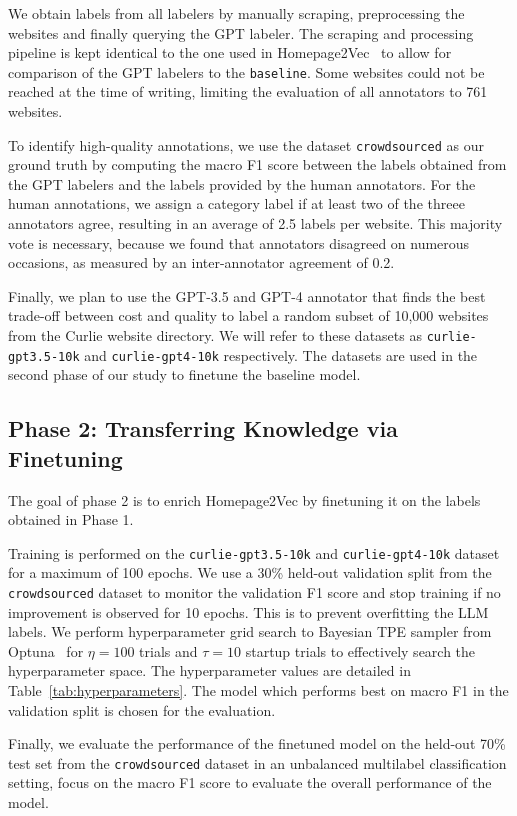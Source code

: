 We obtain labels from all labelers by manually scraping, preprocessing the websites and finally querying the GPT labeler. The scraping and processing pipeline is kept identical to the one used in Homepage2Vec~\cite{homepage2vec} to allow for comparison of the GPT labelers to the \texttt{baseline}. Some websites could not be reached at the time of writing, limiting the evaluation of all annotators to 761 websites.

To identify high-quality annotations, we use the dataset \texttt{crowdsourced} as our ground truth by computing the macro F1 score between the labels obtained from the GPT labelers and the labels provided by the human annotators. For the human annotations, we assign a category label if at least two of the threee annotators agree, resulting in an average of 2.5 labels per website. This majority vote is necessary, because we found that annotators disagreed on numerous occasions, as measured by an inter-annotator agreement of 0.2.

Finally, we plan to use the GPT-3.5 and GPT-4 annotator that finds the best trade-off between cost and quality to label a random subset of 10,000 websites from the Curlie website directory. We will refer to these datasets as \texttt{curlie-gpt3.5-10k} and \texttt{curlie-gpt4-10k} respectively. The datasets are used in the second phase of our study to finetune the baseline model.

\subsection*{Phase 2: Transferring Knowledge via Finetuning}

The goal of phase 2 is to enrich Homepage2Vec by finetuning it on the labels obtained in Phase 1.

Training is performed on the \texttt{curlie-gpt3.5-10k} and \texttt{curlie-gpt4-10k} dataset for a maximum of 100 epochs. We use a 30\% held-out validation split from the \texttt{crowdsourced} dataset to monitor the validation F1 score and stop training if no improvement is observed for 10 epochs. This is to prevent overfitting the LLM labels. We perform hyperparameter grid search to Bayesian TPE sampler from Optuna~\cite{optuna} for $\eta=100$ trials and $\tau=10$ startup trials to effectively search the hyperparameter space. The hyperparameter values are detailed in Table~\ref{tab:hyperparameters}. The model which performs best on macro F1 in the validation split is chosen for the evaluation.



Finally, we evaluate the performance of the finetuned model on the held-out 70\% test set from the \texttt{crowdsourced} dataset in an unbalanced multilabel classification setting, focus on the macro F1 score to evaluate the overall performance of the model.

